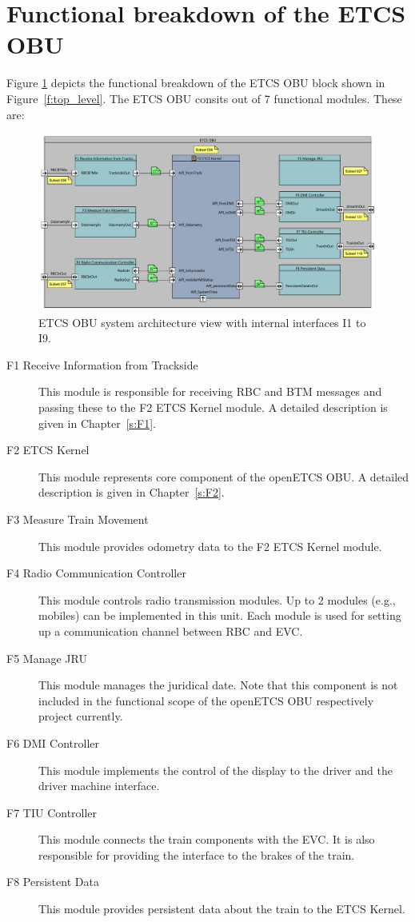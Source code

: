 \section{Functional breakdown of the ETCS OBU}

Figure \ref{f:ETCS_OBU_decomposition} depicts the functional breakdown of the ETCS OBU block shown in Figure~\ref{f:top_level}. The ETCS OBU consits out of 7 functional modules. These are:
\begin{figure}
\centering
\includegraphics[width=\textwidth]{images/F2_ETCS_Kernel.pdf}
\caption{ETCS OBU system architecture view with internal interfaces I1 to I9.}
\label{f:ETCS_OBU_decomposition}
\end{figure}
\begin{description}
\item[F1 Receive Information from Trackside] This module is responsible for receiving RBC and BTM messages and passing these to the F2 ETCS Kernel module. A detailed description is given in Chapter~\ref{s:F1}.
\item[F2 ETCS Kernel] This module represents core component of the openETCS OBU. A detailed description is given in Chapter~\ref{s:F2}.
\item[F3 Measure Train Movement] This module provides odometry data to the F2 ETCS Kernel module.
\item[F4 Radio Communication Controller] This module controls radio transmission modules. Up to 2 modules (e.g., mobiles) can be implemented in this unit. Each module is used for setting up a communication channel between RBC and EVC. 
\item[F5 Manage JRU] This module manages the juridical date. Note that this component is not included in the functional scope of the openETCS OBU respectively project currently.
\item[F6 DMI Controller] This module implements the control of the display to the driver and the driver machine interface. 
\item[F7 TIU Controller] This module connects the train components with the EVC. It is also responsible for providing the interface to the brakes of the train.
\item[F8 Persistent Data] This module provides persistent data about the train to the ETCS Kernel.
\end{description}

